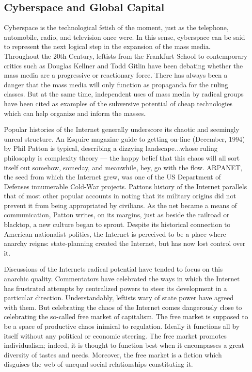 \documentclass[letterpaper,12pt,english]{sphinxmanual}
\begin{document}
\subsection{Cyberspace and Global Capital}
\label{1995:cyberspace-and-global-capital}
Cyberspace is the technological fetish of the moment, just as the telephone, automobile, radio, and television once were. In this sense, cyberspace can be said to represent the next logical step in the expansion of the mass media. Throughout the 20th Century, leftists from the Frankfurt School to contemporary critics such as Douglas Kellner and Todd Gitlin have been debating whether the mass media are a progressive or reactionary force. There has always been a danger that the mass media will only function as propaganda for the ruling classes. But at the same time, independent uses of mass media by radical groups have been cited as examples of the subversive potential of cheap technologies which can help organize and inform the masses.

Popular histories of the Internet generally underscore its chaotic and seemingly unreal structure. An Esquire magazine guide to getting on-line (December, 1994) by Phil Patton is typical, describing a dizzying landscape...whose ruling philosophy is complexity theory — the happy belief that this chaos will all sort itself out somehow, someday, and meanwhile, hey, go with the flow. ARPANET, the seed from which the Internet grew, was one of the US Department of Defenses innumerable Cold-War projects. Pattons history of the Internet parallels that of most other popular accounts in noting that its military origins did not prevent it from being appropriated by civilians. As the net became a means of communication, Patton writes, on its margins, just as beside the railroad or blacktop, a new culture began to sprout. Despite its historical connection to American nationalist politics, the Internet is perceived to be a place where anarchy reigns: state-planning created the Internet, but has now lost control over it.

Discussions of the Internets radical potential have tended to focus on this anarchic quality. Commentators have celebrated the ways in which the Internet has frustrated attempts by centralized powers to steer its development in a particular direction. Understandably, leftists wary of state power have agreed with them. But celebrating the chaos of the Internet comes dangerously close to celebrating the so-called free market of capitalism. The free market is supposed to be a space of productive chaos inimical to regulation. Ideally it functions all by itself without any political or economic steering. The free market promotes individualism; indeed, it is thought to function best when it encompasses a great diversity of tastes and needs. Moreover, the free market is a fiction which disguises the web of unequal social relationships constituting it.
\end{document}
